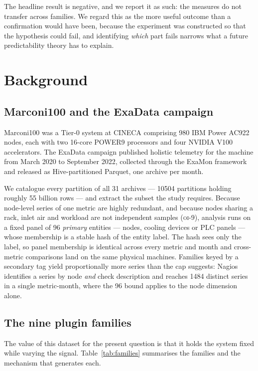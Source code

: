 \documentclass[11pt,a4paper]{article}
\newcommand{\num}[1]{#1}
\newcommand{\oi}[1]{\textsc{oi-#1}}
\begin{document}
The headline result is negative, and we report it as such: the measures do not
transfer across families. We regard this as the more useful outcome than a
confirmation would have been, because the experiment was constructed so that
the hypothesis could fail, and identifying \emph{which} part fails narrows what
a future predictability theory has to explain.

\section{Background}
\label{sec:background}

\subsection{Marconi100 and the ExaData campaign}

Marconi100 was a Tier-0 system at CINECA comprising 980 IBM Power AC922 nodes,
each with two 16-core POWER9 processors and four NVIDIA V100 accelerators. The
ExaData campaign published holistic telemetry for the machine from March 2020 to
September 2022, collected through the ExaMon framework and released as
Hive-partitioned Parquet, one archive per month.

We catalogue every partition of all 31 archives --- \num{10504} partitions
holding roughly \num{55} billion rows --- and extract the subset the study
requires. Because node-level series of one metric are highly redundant, and
because nodes sharing a rack, inlet air and workload are not independent
samples (\oi{9}), analysis runs on a fixed panel of \num{96} \emph{primary}
entities --- nodes, cooling devices or PLC panels --- whose membership is a
stable hash of the entity label. The hash sees only the label, so panel
membership is identical across every metric and month and cross-metric
comparisons land on the same physical machines. Families keyed by a secondary
tag yield proportionally more series than the cap suggests: Nagios identifies a
series by node \emph{and} check description and reaches \num{1484} distinct
series in a single metric-month, where the \num{96} bound applies to the node
dimension alone.

\subsection{The nine plugin families}
\label{sec:families}

The value of this dataset for the present question is that it holds the system
fixed while varying the signal. Table~\ref{tab:families} summarises the
families and the mechanism that generates each.
\end{document}
